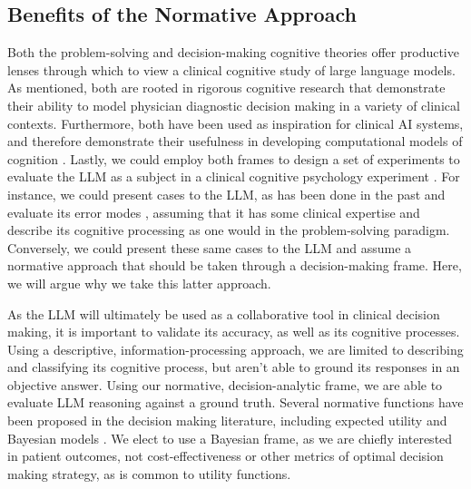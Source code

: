 \subsection{Benefits of the Normative Approach}
Both the problem-solving and decision-making cognitive theories offer productive lenses through which to view a clinical cognitive study of large language models. As mentioned, both are rooted in rigorous cognitive research that demonstrate their ability to model physician diagnostic decision making in a variety of clinical contexts. Furthermore, both have been used as inspiration for clinical AI systems, and therefore demonstrate their usefulness in developing computational models of cognition \citep{clanceyNEOMYCINReconfiguringRulebased1981, gronchiDualprocessTheoriesThought2024}. Lastly, we could employ both frames to design a set of experiments to evaluate the LLM as a subject in a clinical cognitive psychology experiment \citep{binz2023using}. For instance, we could present cases to the LLM, as has been done in the past and evaluate its error modes \citep{kanjee2023accuracy}, assuming that it has some clinical expertise and describe its cognitive processing as one would in the problem-solving paradigm. Conversely, we could present these same cases to the LLM and assume a normative approach that should be taken through a decision-making frame. Here, we will argue why we take this latter approach. 

As the LLM will ultimately be used as a collaborative tool in clinical decision making, it is important to validate its accuracy, as well as its cognitive processes. Using a descriptive, information-processing approach, we are limited to describing and classifying its cognitive process, but aren't able to ground its responses in an objective answer. Using our normative, decision-analytic frame, we are able to evaluate LLM reasoning against a ground truth. Several normative functions have been proposed in the decision making literature, including expected utility \citep{briggsNormativeTheoriesRational2023} and Bayesian models \citep{maBayesianDecisionModels2019}. We elect to use a Bayesian frame, as we are chiefly interested in patient outcomes, not cost-effectiveness or other metrics of optimal decision making strategy, as is common to utility functions. 

